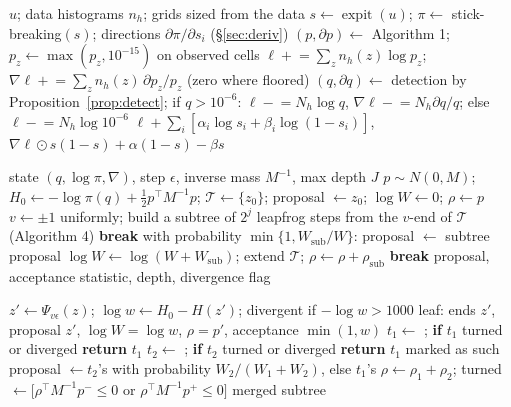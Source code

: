 \documentclass[11pt]{article}
\theoremstyle{definition}
\theoremstyle{remark}
\newcommand{\code}[1]{\texttt{\detokenize{#1}}}
\DeclareMathOperator{\expit}{expit}
\begin{document}
\begin{algorithm}[H]
\caption{Log-posterior and gradient in logit coordinates (\code{log_posterior_u})}
\begin{algorithmic}[1]
\Require $u$; data histograms $n_h$; grids sized from the data
\State $s\gets\expit(u)$; $\pi\gets$ stick-breaking$(s)$; directions $\partial\pi/\partial s_i$ (\S\ref{sec:deriv})
  \State $(p,\partial p)\gets$ Algorithm 1; $p_z\gets\max(p_z,10^{-15})$ on observed cells
  \State $\ell\mathrel{+}=\sum_zn_h(z)\log p_z$; $\nabla\ell\mathrel{+}=\sum_zn_h(z)\,\partial p_z/p_z$ (zero where floored)
  \State $(q,\partial q)\gets$ detection by Proposition~\ref{prop:detect}; if $q>10^{-6}$: $\ell\mathrel{-}=N_h\log q$, $\nabla\ell\mathrel{-}=N_h\partial q/q$; else $\ell\mathrel{-}=N_h\log10^{-6}$
\EndFor
\State \Return $\ell+\sum_i[\alpha_i\log s_i+\beta_i\log(1-s_i)]$,\ \ $\nabla\ell\odot s(1-s)+\alpha(1-s)-\beta s$
\end{algorithmic}
\end{algorithm}

\begin{algorithm}[H]
\caption{One NUTS transition (multinomial, generalised U-turn)}
\begin{algorithmic}[1]
\Require state $(q,\log\pi,\nabla)$, step $\epsilon$, inverse mass $M^{-1}$, max depth $J$
\State $p\sim N(0,M)$; $H_0\gets-\log\pi(q)+\frac12p^\top M^{-1}p$; $\mathcal T\gets\{z_0\}$; proposal $\gets z_0$; $\log W\gets0$; $\rho\gets p$
  \State $v\gets\pm1$ uniformly; build a subtree of $2^j$ leapfrog steps from the $v$-end of $\mathcal T$ (Algorithm 4)
   \textbf{break} 
  \EndIf
  \State with probability $\min\{1,W_{\mathrm{sub}}/W\}$: proposal $\gets$ subtree proposal 
  \State $\log W\gets\log(W+W_{\mathrm{sub}})$; extend $\mathcal T$; $\rho\gets\rho+\rho_{\mathrm{sub}}$
   \textbf{break}
  \EndIf
\EndFor
\State \Return proposal, acceptance statistic, depth, divergence flag
\end{algorithmic}
\end{algorithm}

\begin{algorithm}[H]
\caption{Build a subtree (recursive)}
\begin{algorithmic}[1]
    \State $z'\gets\Psi_{v\epsilon}(z)$; $\log w\gets H_0-H(z')$; divergent if $-\log w>1000$
    \State \Return leaf: ends $z'$, proposal $z'$, $\log W=\log w$, $\rho=p'$, acceptance $\min(1,w)$
  \EndIf
  \State $t_1\gets$ ; \textbf{if} $t_1$ turned or diverged \textbf{return} $t_1$
  \State $t_2\gets$ ; \textbf{if} $t_2$ turned or diverged \textbf{return} $t_1$ marked as such
  \State proposal $\gets t_2$'s with probability $W_2/(W_1+W_2)$, else $t_1$'s 
  \State $\rho\gets\rho_1+\rho_2$; turned $\gets[\rho^\top M^{-1}p^-\le0$ or $\rho^\top M^{-1}p^+\le0]$
  \State \Return merged subtree
\EndFunction
\end{algorithmic}
\end{algorithm}
\end{document}
